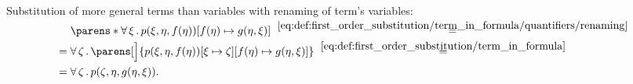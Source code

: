 \begin{example}
\begin{thmenum}
     Substitution of more general terms than variables with renaming of term's variables:
    \begin{align*}
      &\phantom{{}={}}
      \parens*{\qforall \xi p(\xi, \eta, f(\eta))}[f(\eta) \mapsto g(\eta, \xi)]
      \reloset {\eqref{eq:def:first_order_substitution/term_in_formula/quantifiers/renaming}} = \\ &=
      \qforall \zeta \parens[\Big]{p(\xi, \eta, f(\eta))[\xi \mapsto \zeta][f(\eta) \mapsto g(\eta, \xi)]}
      \reloset {\eqref{eq:def:first_order_substitution/term_in_formula}} = \\ &=
      \qforall \zeta p(\zeta, \eta, g(\eta, \xi)).
    \end{align*}
  \end{thmenum}
\end{example}


